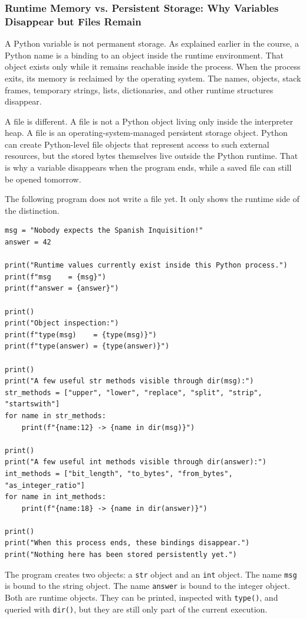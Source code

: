 \subsubsection{Runtime Memory vs. Persistent Storage: Why Variables Disappear but Files Remain}

A Python variable is not permanent storage. As explained earlier in the course, a Python name is a binding to an object inside the runtime environment. That object exists only while it remains reachable inside the process. When the process exits, its memory is reclaimed by the operating system. The names, objects, stack frames, temporary strings, lists, dictionaries, and other runtime structures disappear.

A file is different. A file is not a Python object living only inside the interpreter heap. A file is an operating-system-managed persistent storage object. Python can create Python-level file objects that represent access to such external resources, but the stored bytes themselves live outside the Python runtime. That is why a variable disappears when the program ends, while a saved file can still be opened tomorrow.

The following program does not write a file yet. It only shows the runtime side of the distinction.

\begin{verbatim}
msg = "Nobody expects the Spanish Inquisition!"
answer = 42

print("Runtime values currently exist inside this Python process.")
print(f"msg    = {msg}")
print(f"answer = {answer}")

print()
print("Object inspection:")
print(f"type(msg)    = {type(msg)}")
print(f"type(answer) = {type(answer)}")

print()
print("A few useful str methods visible through dir(msg):")
str_methods = ["upper", "lower", "replace", "split", "strip", "startswith"]
for name in str_methods:
    print(f"{name:12} -> {name in dir(msg)}")

print()
print("A few useful int methods visible through dir(answer):")
int_methods = ["bit_length", "to_bytes", "from_bytes", "as_integer_ratio"]
for name in int_methods:
    print(f"{name:18} -> {name in dir(answer)}")

print()
print("When this process ends, these bindings disappear.")
print("Nothing here has been stored persistently yet.")
\end{verbatim}

The program creates two objects: a \texttt{str} object and an \texttt{int} object. The name \texttt{msg} is bound to the string object. The name \texttt{answer} is bound to the integer object. Both are runtime objects. They can be printed, inspected with \texttt{type()}, and queried with \texttt{dir()}, but they are still only part of the current execution.

